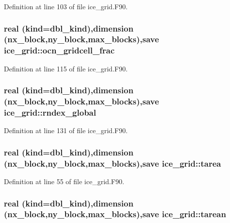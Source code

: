 Definition at line 103 of file ice\_\-grid.F90.\hypertarget{namespaceice__grid_a5241715733bdedb6dc95cff6f23292de}{
\subsubsection[{ocn\_\-gridcell\_\-frac}]{\setlength{\rightskip}{0pt plus 5cm}real (kind=dbl\_\-kind),dimension (nx\_\-block,ny\_\-block,max\_\-blocks),save {\bf ice\_\-grid::ocn\_\-gridcell\_\-frac}}}
\label{namespaceice__grid_a5241715733bdedb6dc95cff6f23292de}


Definition at line 115 of file ice\_\-grid.F90.\hypertarget{namespaceice__grid_ab75f2e02f6911b1eacbb7a0647f947b7}{
\subsubsection[{rndex\_\-global}]{\setlength{\rightskip}{0pt plus 5cm}real (kind=dbl\_\-kind),dimension (nx\_\-block,ny\_\-block,max\_\-blocks),save {\bf ice\_\-grid::rndex\_\-global}}}
\label{namespaceice__grid_ab75f2e02f6911b1eacbb7a0647f947b7}


Definition at line 131 of file ice\_\-grid.F90.\hypertarget{namespaceice__grid_af9d3e2476e44dd679c4062b370f21ffa}{
\subsubsection[{tarea}]{\setlength{\rightskip}{0pt plus 5cm}real (kind=dbl\_\-kind),dimension (nx\_\-block,ny\_\-block,max\_\-blocks),save {\bf ice\_\-grid::tarea}}}
\label{namespaceice__grid_af9d3e2476e44dd679c4062b370f21ffa}


Definition at line 55 of file ice\_\-grid.F90.\hypertarget{namespaceice__grid_a233932d1edd125ed1e3c0cc7b990f256}{
\subsubsection[{tarean}]{\setlength{\rightskip}{0pt plus 5cm}real (kind=dbl\_\-kind),dimension (nx\_\-block,ny\_\-block,max\_\-blocks),save {\bf ice\_\-grid::tarean}}}
\label{namespaceice__grid_a233932d1edd125ed1e3c0cc7b990f256}


